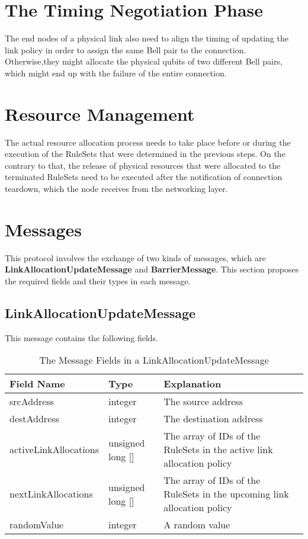 \section{The Timing Negotiation Phase}

The end nodes of a physical link also need to align the timing of updating the link policy in order to assign the same Bell pair to the connection.
Otherwise,they might allocate the physical qubits of two different Bell pairs, which might end up with the failure of the entire connection.

\section{Resource Management}

The actual resource allocation process needs to take place before or during the execution of the RuleSets that were determined in the previous steps.
On the contrary to that, the release of physical resources that were allocated to the terminated RuleSets need to be executed after the notification of connection teardown, which the node receives from the networking layer.

\section{Messages}

This protocol involves the exchange of two kinds of messages, which are \textbf{LinkAllocationUpdateMessage} and \textbf{BarrierMessage}.
This section proposes the required fields and their types in each message.

\subsection{LinkAllocationUpdateMessage}
 
This message contains the following fields.

\begin{table}[ht]
  \begin{center}
    \begin{tabular}{|m{5em}|m{5em}|m{10em}|} \hline
      Field Name & Type & Explanation \\ \hline \cline{1-3}
      srcAddress & integer & The source address \\ \cline{1-3}
      destAddress & integer & The destination address \\ \cline{1-3}
      activeLinkAllocations & unsigned long [] & The array of IDs of the RuleSets in the active link allocation policy \\ \cline{1-3}
      nextLinkAllocations & unsigned long [] & The array of IDs of the RuleSets in the upcoming link allocation policy \\ \cline{1-3}
      randomValue & integer & A random value \\ \cline{1-3}
    \end{tabular}
    \caption{The Message Fields in a LinkAllocationUpdateMessage}
  \end{center}
\end{table}

